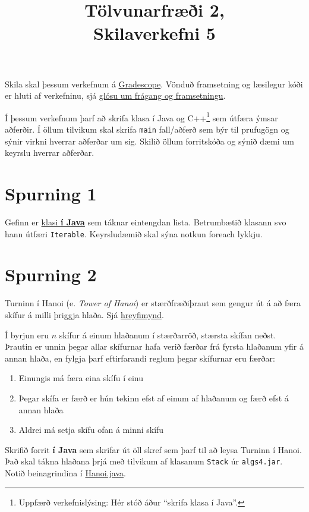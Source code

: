 \documentclass{article}
\title{Tölvunarfræði 2, \semester \\ Skilaverkefni 5}
\author{}
\begin{document}
\maketitle
{}

Skila skal þessum verkefnum á \href{https://gradescope.com/courses/5640}{Gradescope}. Vönduð framsetning og læsilegur kóði er hluti af verkefninu, sjá \href{https://piazza.com/class/ixkicfen49l111?cid=52}{glósu um frágang og framsetningu}.

Í þessum verkefnum þarf að skrifa klasa í Java og C++\footnote{Uppfærð verkefnislýsing: Hér stóð áður ``skrifa klasa í Java''.} sem útfæra ýmsar aðferðir. Í öllum tilvikum skal skrifa \texttt{main} fall/aðferð sem býr til prufugögn og sýnir virkni hverrar aðferðar um sig. Skilið öllum forritskóða og sýnið dæmi um keyrslu hverrar aðferðar.

\section{Spurning 1}
Gefinn er \href{https://raw.githubusercontent.com/Ernir/kennsluefni/master/T2/Code/w5/SimpleSinglyLinkedList.java}{klasi \textbf{í Java}} sem táknar eintengdan lista. Betrumbætið klasann svo hann útfæri \texttt{Iterable}. Keyrsludæmið skal sýna notkun foreach lykkju.

\section{Spurning 2}
Turninn í Hanoi (e. \emph{Tower of Hanoi}) er stærðfræðiþraut sem gengur út á að færa skífur á milli þriggja hlaða. Sjá \href{https://www.tutorialspoint.com/data_structures_algorithms/images/tower_of_hanoi.gif}{hreyfimynd}.

Í byrjun eru $n$ skífur á einum hlaðanum í stærðarröð, stærsta skífan neðst. Þrautin er unnin þegar allar skífurnar hafa verið færðar frá fyrsta hlaðanum yfir á annan hlaða, en fylgja þarf eftirfarandi reglum þegar skífurnar eru færðar:
\begin{enumerate}
 \item Einungis má færa eina skífu í einu
 \item Þegar skífa er færð er hún tekinn efst af einum af hlaðanum og færð efst á annan hlaða
 \item Aldrei má setja skífu ofan á minni skífu
\end{enumerate}

Skrifið forrit \textbf{í Java} sem skrifar út öll skref sem þarf til að leysa Turninn í Hanoi. Það skal tákna hlaðana þrjá með tilvikum af klasanum \texttt{Stack} úr \texttt{algs4.jar}. Notið beinagrindina í \href{https://raw.githubusercontent.com/Ernir/kennsluefni/master/T2/Code/w5/Hanoi.java}{Hanoi.java}.
\end{document}
